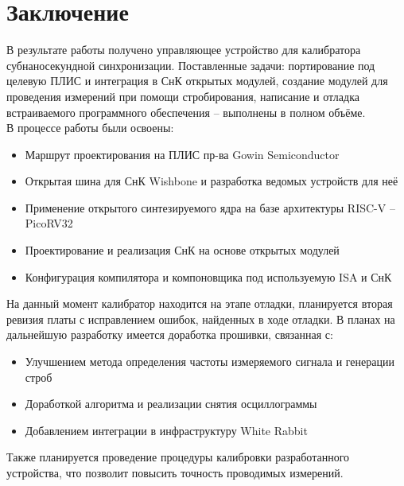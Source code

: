 \chapter*{Заключение} \label{ch-conclusion}

В результате работы получено управляющее устройство для калибратора субнаносекундной синхронизации.
Поставленные задачи: портирование под целевую ПЛИС и интеграция в СнК открытых модулей, создание
модулей для проведения измерений при помощи стробирования, написание и отладка встраиваемого программного обеспечения -- выполнены в полном объёме.\\

\noindent В процессе работы были освоены:
\begin{itemize}
	\item Маршрут проектирования на ПЛИС пр-ва Gowin Semiconductor
	\item Открытая шина для СнК Wishbone и разработка ведомых устройств для неё
	\item Применение открытого синтезируемого ядра на базе архитектуры RISC-V -- PicoRV32
	\item Проектирование и реализация СнК на основе открытых модулей
	\item Конфигурация компилятора и компоновщика под используемую ISA и СнК\\
\end{itemize}

На данный момент калибратор находится на этапе отладки, планируется вторая ревизия платы с исправлением ошибок, найденных в ходе отладки.
В планах на дальнейшую разработку имеется доработка прошивки, связанная с:
\begin{itemize}
	\item Улучшением метода определения частоты измеряемого сигнала и генерации строб
	\item Доработкой алгоритма и реализации снятия осциллограммы
	\item Добавлением интеграции в инфраструктуру White Rabbit\\
\end{itemize}

Также планируется проведение процедуры калибровки разработанного устройства, что позволит повысить точность проводимых измерений.
